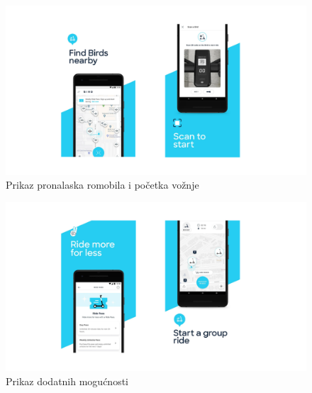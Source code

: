 	

		\begin{figure} [H]
			
			\includegraphics[width=1\linewidth]{slike/BirdApp1.png}
			\centering
			\caption{Prikaz pronalaska romobila i početka vožnje}
			\label{fig:Prikaz pronalaska romobila i započinjanja vožnje}
		\end{figure}
		
		\begin{figure} [H]
			
			\includegraphics[width=1\linewidth]{slike/BirdApp2.png}
			\centering
			\caption{Prikaz dodatnih mogućnosti}
			\label{fig:Prikaz dodatnih mogućnosti}
		\end{figure}
		
		
		
		
		
		
		
	